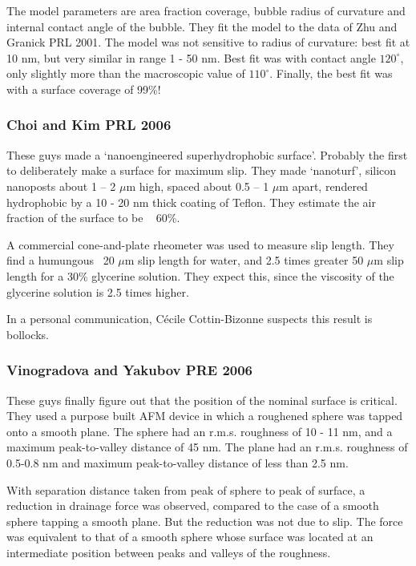 \documentclass{article}
\begin{document}
The model parameters are area fraction coverage, bubble radius of curvature and internal contact angle of the bubble.  They fit the model to the data of Zhu and Granick PRL 2001. The model was not sensitive to radius of curvature: best fit at 10 nm, but very similar in range 1 - 50 nm.  Best fit was with contact angle $120^{\circ}$, only slightly more than the macroscopic value of $110^{\circ}$. Finally, the best fit was with a surface coverage of 99\%! 

\subsubsection*{Choi and Kim PRL 2006}

These guys made a `nanoengineered superhydrophobic surface'. Probably the first to deliberately make a surface for maximum slip.  They made `nanoturf', silicon nanoposts about 1 -- 2 $\mu$m high, spaced about 0.5 -- 1 $\mu$m apart, rendered hydrophobic by a 10 - 20 nm thick coating of Teflon.  They estimate the air fraction of the surface to be ~ 60\%.

A commercial cone-and-plate rheometer was used to measure slip length.  They find a humungous ~20 $\mu$m slip length for water, and 2.5 times greater 50 $\mu$m slip length for a 30\% glycerine solution.  They expect this, since the viscosity of the glycerine solution is 2.5 times higher.

In a personal communication, C\'{e}cile Cottin-Bizonne suspects this result is bollocks.


\subsubsection*{Vinogradova and Yakubov PRE 2006}

These guys finally figure out that the position of the nominal surface is critical.
They used a purpose built AFM device in which a roughened sphere was tapped onto a smooth plane.  The sphere had an r.m.s. roughness of 10 - 11 nm, and a maximum peak-to-valley distance of 45 nm. The plane had an r.m.s. roughness of 0.5-0.8 nm and maximum peak-to-valley distance of less than 2.5 nm.

With separation distance taken from peak of sphere to peak of surface, a reduction in drainage force was observed, compared to the case of a smooth sphere tapping a smooth plane.  But the reduction was not due to slip.  The force was equivalent to that of a smooth sphere whose surface was located at an intermediate position between peaks and valleys of the roughness.
\end{document}
